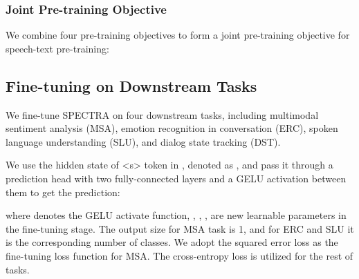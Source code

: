 \documentclass[11pt]{article}
\begin{document}
\subsubsection{Joint Pre-training Objective}
We combine four pre-training objectives to form a joint pre-training objective for speech-text pre-training:


\subsection{Fine-tuning on Downstream Tasks}
We fine-tune SPECTRA on four downstream tasks, including multimodal sentiment analysis (MSA), emotion recognition in conversation (ERC), spoken language understanding (SLU), and dialog state tracking (DST). 


We use the hidden state of <s> token in , denoted as  , and pass it through a prediction head with two fully-connected layers and a GELU activation \citep{hendrycks2016gaussian} between them to get the prediction:

where  denotes the GELU activate function, , ,
,
 are new learnable parameters in the fine-tuning stage.
The output size  for MSA task is 1, and for ERC and SLU it is the corresponding number of classes.
We adopt the squared error loss as the fine-tuning loss function for MSA. The cross-entropy loss is utilized for the rest of tasks. 


\begin{table*}[]
\centering
{}
\caption{The comparison between the key metrics of our model and the previous SOTA method on five datasets. }
\label{tab:main_results}
\end{table*}
\end{document}
